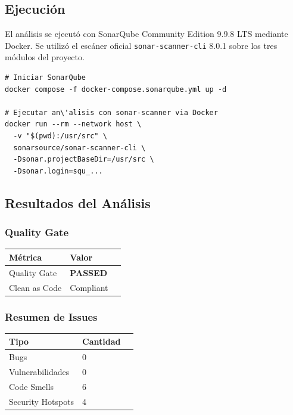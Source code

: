 \documentclass[12pt,a4paper]{article}
\begin{document}
\subsection{Ejecuci\'on}

El an\'alisis se ejecut\'o con SonarQube Community Edition 9.9.8 LTS mediante
Docker. Se utiliz\'o el esc\'aner oficial \texttt{sonar-scanner-cli} 8.0.1
sobre los tres m\'odulos del proyecto.

\vspace{0.3cm}
\begin{lstlisting}[style=bashstyle]
# Iniciar SonarQube
docker compose -f docker-compose.sonarqube.yml up -d

# Ejecutar an\'alisis con sonar-scanner via Docker
docker run --rm --network host \
  -v "$(pwd):/usr/src" \
  sonarsource/sonar-scanner-cli \
  -Dsonar.projectBaseDir=/usr/src \
  -Dsonar.login=squ_...
\end{lstlisting}

\subsection{Resultados del An\'alisis}

\subsubsection{Quality Gate}

\begin{tabularx}{\textwidth}{lXr}
  \toprule
  \textbf{M\'etrica} & \textbf{Valor} & \\
  \midrule
  Quality Gate & \textcolor{green!40!black}{\textbf{PASSED}} & \\
  Clean as Code & Compliant & \\
  \bottomrule
\end{tabularx}

\subsubsection{Resumen de Issues}

\begin{tabularx}{\textwidth}{lXr}
  \toprule
  \textbf{Tipo} & \textbf{Cantidad} & \\
  \midrule
  Bugs & 0 & \\
  Vulnerabilidades & 0 & \\
  Code Smells & 6 & \\
  Security Hotspots & 4 & \\
  \bottomrule
\end{tabularx}
\end{document}
